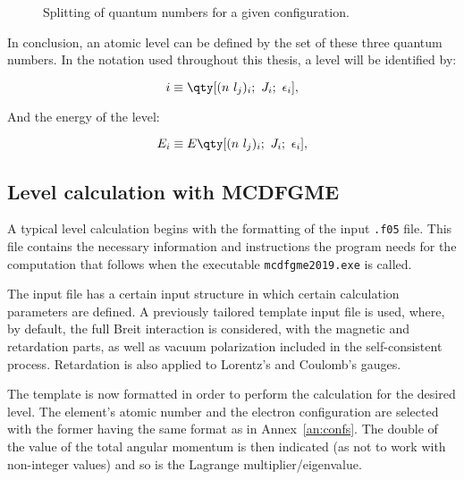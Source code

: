 \begin{figure}[h!]
    \caption{Splitting of quantum numbers for a given configuration.}
    \label{fig:manifold}
\end{figure}

In conclusion, an atomic level can be defined by the set of these three quantum numbers. In the notation used throughout this thesis, a level will be identified by:

\begin{equation}
    i\equiv \qty[(n\ l_j)_i;\ J_i;\ \epsilon_i],
\end{equation}

And the energy of the level:

\begin{equation}
    E_i\equiv E \qty[(n\ l_j)_i;\ J_i;\ \epsilon_i],
\end{equation}



\subsection{Level calculation with \gls{MCDFGME}}

A typical level calculation begins with the formatting of the input \verb|.f05| file. This file contains the necessary information and instructions the program needs for the computation that follows when the executable \verb|mcdfgme2019.exe| is called.

The input file has a certain input structure in which certain calculation parameters are defined. A previously tailored template input file is used, where, by default, the full Breit interaction is considered, with the magnetic and retardation parts, as well as vacuum polarization  included in the self-consistent process. Retardation is also applied to Lorentz's and Coulomb's gauges.

The template is now formatted in order to perform the calculation for the desired level. The element's atomic number and the electron configuration are selected with the former having the same format as in Annex~\ref{an:confs}. The double of the value of the  total angular momentum is then indicated (as not to work with non-integer values) and so is the Lagrange multiplier/eigenvalue.

